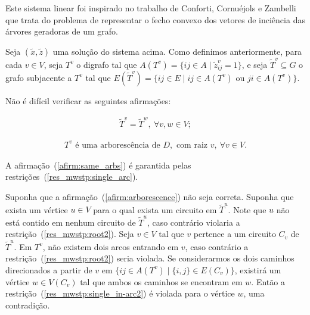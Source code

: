 
\begin{lpformulation}[]
\end{lpformulation}
    Este sistema linear foi inspirado no trabalho de Conforti,
      Cornu{\'{e}}jols e
      Zambelli~\cite{ConfortiCZ2013}
      que trata do problema de 
      representar o fecho convexo dos vetores de inciência das árvores
geradoras de um grafo.

\medskip

Seja $(\tilde{x},\tilde{z})$ uma solução do sistema acima. 
Como definimos anteriormente, para cada  $v \in V$, seja  $T^v$ 
o digrafo tal que $A(T^{v}) = \{ij \in A \; |\; \tilde{z}^{v}_{ij} = 1\}$, e seja
$\widetilde{T}^{v} \subseteq G$ o grafo subjacente
a $T^{v}$ tal que \mbox{$E(\widetilde{T}^{v}) = \{ij \in E\; |\; ij \in A(T^{v}) \text{ ou }ji
  \in A(T^{v})\}$}.

Não é difícil verificar as seguintes afirmações:



\begin{align}
  \label{afirm:same_arbs}
  \widetilde{T}^{v} = \widetilde{T}^{w}, \: \forall v, w \in V; 
\end{align}

\begin{align}
  \label{afirm:arborescence}
  T^{v} \text{ é uma arborescência de }D, \text{ com raiz }v, \: \forall v \in V.
\end{align}


A afirmação~(\ref{afirm:same_arbs}) é garantida pelas
restrições~(\ref{res_mwstp:single_arc}).

Suponha que a afirmação~(\ref{afirm:arborescence}) não seja correta. Suponha que exista
um vértice $u \in V$ para o qual exista um circuito em $\widetilde{T}^{u}$. Note que
$u$ não está contido em nenhum circuito de $\widetilde{T}^{u}$, caso contrário
violaria a restrição~(\ref{res_mwstp:root2}). 
Seja $v \in V$ tal que $v$ pertence  a um circuito $C_{v}$ de
$\widetilde{T}^{u}$. Em $T^v$, não existem dois arcos entrando em $v$, caso
contrário a restrição~(\ref{res_mwstp:root2}) seria violada.
Se considerarmos os dois caminhos direcionados a partir de $v$ em
$\{ij \in A(T^v)\; | \; \{i,j\} \in E(C_{v}) \}$, existirá um vértice
$w \in V(C_{v})$ tal que ambos os caminhos se encontram em $w$.
Então a restrição~(\ref{res_mwstp:single_in-arc2}) é violada para o vértice
$w$, uma contradição.

